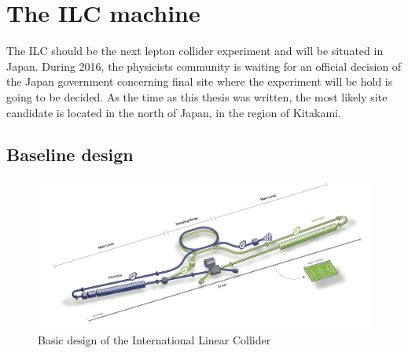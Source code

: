 
  \section{The ILC machine}
  
    The \gls{ILC} should be the next lepton collider experiment and will be situated in Japan.
    During 2016, the physicists community is waiting for an official decision of the Japan government concerning final site where the experiment will be hold is going to be decided.
    As the time as this thesis was written, the most likely site candidate is located in the north of Japan, in the region of Kitakami. 
    
    \subsection{Baseline design}

   \begin{figure}[!h]
      \centering
      \includegraphics[width = 16 cm]{Pictures/ILC/ILC}
      \caption{Basic design of the International Linear Collider}
      \label{fig:ILC}
    \end{figure}



